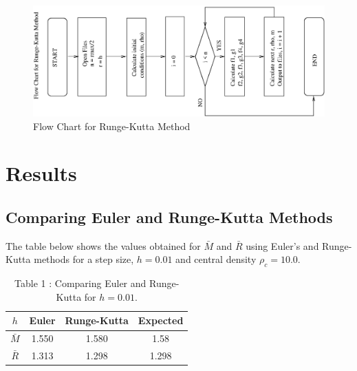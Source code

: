 \documentclass[a4paper]{IEEEtran}
\begin{document}
    \begin{figure}
    \caption{Flow Chart for Runge-Kutta Method}
    \label{fig:runge-kutta} 
    \begin{center}
        \includegraphics[width=\columnwidth,angle=-90]{figures/flow.eps}
    \end{center}
    \end{figure} 


\section{Results}


    \subsection{Comparing Euler and Runge-Kutta Methods}
    The table below shows the values obtained for $\bar{M}$
    and $\bar{R}$ using Euler's and Runge-Kutta methods for
    a step size, $h = 0.01$ and central density $\rho_c = 10.0$.

    \begin{table}
    \caption{Table 1 : Comparing Euler and Runge-Kutta for $h=0.01$.} 
    \label{tbl:euler-runge-kutta} 
    \begin{center}
    \begin{tabular}{c|ccc} \hline
    $h$                 & Euler     & Runge-Kutta & Expected\\ \hline 
    $\bar{M}$           & 1.550     & 1.580       & 1.58    \\ 
    $\bar{R}$           & 1.313     & 1.298       & 1.298\\ \hline
    \end{tabular}
    \end{center}
    \end{table} 
\end{document}
